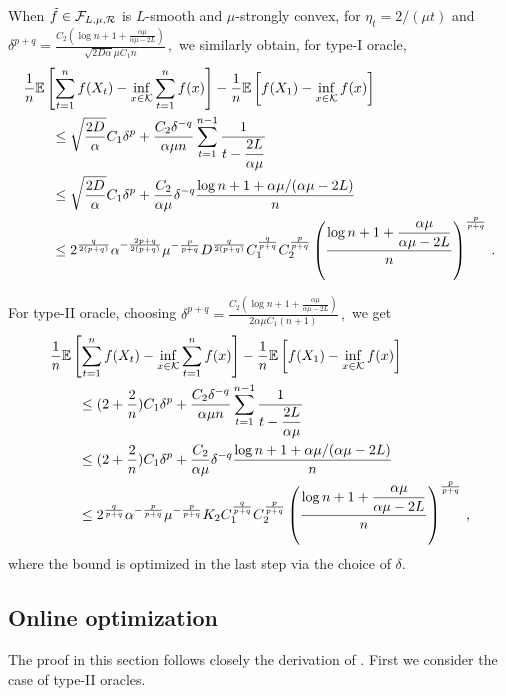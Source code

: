 When $\tilde{f} \in \mathcal{F}_{L,\mu, \mathcal{R}}$ is $L$-smooth and $\mu$-strongly convex, for
$\eta_t = 2/(\mu t)$ and 
$
\delta^{p+q} =  \tfrac{C_2\left( \log n+1+\tfrac{\alpha \mu}{\alpha \mu -2L}\right)}{\sqrt{2D\alpha} \mu C_1 n} \,,
$
we similarly obtain, for type-I oracle, 
 \begin{align*}
 \MoveEqLeft
\frac{1}{n} \EE{ \sum_{t=1}^n f( X_t) - \inf_{x \in \cK} \sum_{t=1}^n f(x)} -\frac{1}{n}\EE{f(X_1)-\inf_{x \in \cK}f(x)}\\
&\le \sqrt{\dfrac{2D}{\alpha}} C_1\delta^p+\dfrac{C_2 \delta^{-q}}{\alpha \mu n} \sum_{t=1}^{n-1}\dfrac{1}{t-\dfrac{2L}{\alpha \mu}}\\
&\le \sqrt{\dfrac{2D}{\alpha}}C_1\delta^p+\dfrac{C_2 }{\alpha \mu}\delta^{-q} \dfrac{\log n+1+\alpha \mu/(\alpha \mu-2L)}{n}\\
&\le 2^{\frac{q}{2(p+q)}}\alpha^{-\frac{2p+q}{2(p+q)}}\mu^{-\frac{p}{p+q}} D^{\frac{q}{2(p+q)}}C_1^{\frac{q}{p+q}}C_2^{\frac{p}{p+q}} \left( \frac{\log n+1+\dfrac{\alpha \mu}{\alpha \mu -2L}}{n} \right)^{\frac{p}{p+q}}\,.
 \end{align*}

For type-II oracle, choosing
$
\delta^{p+q} =  \tfrac{C_2\left( \log n+1+\tfrac{\alpha \mu}{\alpha \mu -2L}\right)}{2\alpha \mu C_1 (n+1)} \,,
$
we get
 \begin{align*}
 \MoveEqLeft
\frac{1}{n} \EE{ \sum_{t=1}^n f( X_t) - \inf_{x \in \cK} \sum_{t=1}^n f(x)} -\frac{1}{n}\EE{f(X_1)-\inf_{x \in \cK}f(x)}\\
&\le (2+\dfrac{2}{n})C_1\delta^p+\dfrac{C_2 \delta^{-q}}{\alpha \mu n} \sum_{t=1}^{n-1}\dfrac{1}{t-\dfrac{2L}{\alpha \mu}}\\
&\le (2+\dfrac{2}{n})C_1\delta^p+\dfrac{C_2 }{\alpha \mu}\delta^{-q} \dfrac{\log n+1+\alpha \mu/(\alpha \mu-2L)}{n}\\
&\le 2^{\frac{q}{p+q}}\alpha^{-\frac{p}{p+q}}\mu^{-\frac{p}{p+q}} K_2C_1^{\frac{q}{p+q}}C_2^{\frac{p}{p+q}} \left( \frac{\log n+1+\dfrac{\alpha \mu}{\alpha \mu -2L}}{n} \right)^{\frac{p}{p+q}}\,,
 \end{align*}
where the bound is optimized in the last step via the choice of $\delta$.



\subsection{Online optimization}
The proof in this section follows closely the derivation of \citet{saha2011improved}. First we consider the case of type-II oracles.

